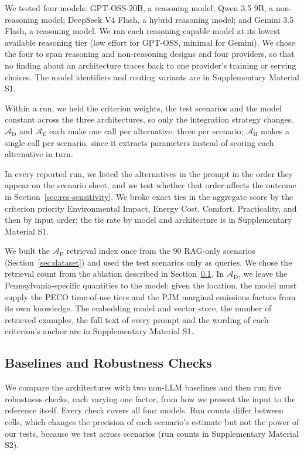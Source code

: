 \documentclass[final,3p,times]{elsarticle}
\begin{document}
We tested four models: GPT-OSS-20B, a reasoning model; Qwen 3.5 9B, a non-reasoning model; DeepSeek V4 Flash, a hybrid reasoning model; and Gemini 3.5 Flash, a reasoning model. We ran each reasoning-capable model at its lowest available reasoning tier (low effort for GPT-OSS, minimal for Gemini). We chose the four to span reasoning and non-reasoning designs and four providers, so that no finding about an architecture traces back to one provider's training or serving choices. The model identifiers and routing variants are in Supplementary Material S1.

Within a run, we held the criterion weights, the test scenarios and the model constant across the three architectures, so only the integration strategy changes. $\mathcal{A}_{\text{D}}$ and $\mathcal{A}_{\text{E}}$ each make one call per alternative, three per scenario; $\mathcal{A}_{\text{H}}$ makes a single call per scenario, since it extracts parameters instead of scoring each alternative in turn.

In every reported run, we listed the alternatives in the prompt in the order they appear on the scenario sheet, and we test whether that order affects the outcome in Section~\ref{sec:res-sensitivity}. We broke exact ties in the aggregate score by the criterion priority Environmental Impact, Energy Cost, Comfort, Practicality, and then by input order; the tie rate by model and architecture is in Supplementary Material S1.

We built the $\mathcal{A}_{\text{E}}$ retrieval index once from the 90 RAG-only scenarios (Section~\ref{sec:dataset}) and used the test scenarios only as queries. We chose the retrieval count from the ablation described in Section~\ref{sec:ablation-design}. In $\mathcal{A}_{\text{D}}$, we leave the Pennsylvania-specific quantities to the model: given the location, the model must supply the PECO time-of-use tiers and the PJM marginal emissions factors from its own knowledge. The embedding model and vector store, the number of retrieved examples, the full text of every prompt and the wording of each criterion's anchor are in Supplementary Material S1.

\FloatBarrier
\subsection{Baselines and Robustness Checks}
\label{sec:ablation-design}
We compare the architectures with two non-LLM baselines and then run five robustness checks, each varying one factor, from how we present the input to the reference itself. Every check covers all four models. Run counts differ between cells, which changes the precision of each scenario's estimate but not the power of our tests, because we test across scenarios (run counts in Supplementary Material S2).
\end{document}
